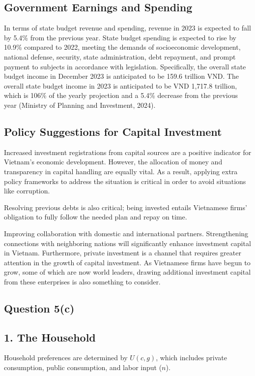 \documentclass{article}
\newcommand{\subsectiontitle}[1]{\subsection*{#1}\addcontentsline{toc}{subsection}{#1}}
\begin{document}
\subsection*{Government Earnings and Spending}
In terms of state budget revenue and spending, revenue in 2023 is expected to fall by 5.4\% from the previous year.  
State budget spending is expected to rise by 10.9\% compared to 2022, meeting the demands of socioeconomic development, national defense, security, state administration, debt repayment, and prompt payment to subjects in accordance with legislation.  
Specifically, the overall state budget income in December 2023 is anticipated to be 159.6 trillion VND.  
The overall state budget income in 2023 is anticipated to be VND 1,717.8 trillion, which is 106\% of the yearly projection and a 5.4\% decrease from the previous year (Ministry of Planning and Investment, 2024).

\subsection*{Policy Suggestions for Capital Investment}
Increased investment registrations from capital sources are a positive indicator for Vietnam's economic development.  
However, the allocation of money and transparency in capital handling are equally vital.  
As a result, applying extra policy frameworks to address the situation is critical in order to avoid situations like corruption.

Resolving previous debts is also critical; being invested entails Vietnamese firms' obligation to fully follow the needed plan and repay on time.

Improving collaboration with domestic and international partners.  
Strengthening connections with neighboring nations will significantly enhance investment capital in Vietnam.  
Furthermore, private investment is a channel that requires greater attention in the growth of capital investment.  
As Vietnamese firms have begun to grow, some of which are now world leaders, drawing additional investment capital from these enterprises is also something to consider.

\subsectiontitle{Question 5(c)}

\subsection*{1. The Household}

Household preferences are determined by \( U(c, g) \), which includes private consumption, public consumption, and labor input (\( n \)).
\end{document}
